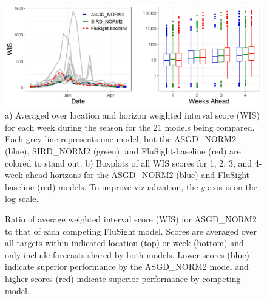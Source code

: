 \documentclass[ba]{imsart}
\theoremstyle{plain}
\theoremstyle{definition}
\theoremstyle{remark}
\begin{document}
\begin{supplement}
\begin{figure}[hbt!]
    \begin{adjustwidth}{-1.2cm}{-1.5cm}
    \includegraphics[scale = .54]{Images/wis_cover_sum.png}
    \caption{a) Averaged over location and horizon weighted interval score
    (WIS) for each week during the season for the 21 models being compared. 
    Each grey line represents one model, but the ASGD\_NORM2 (blue),
    SIRD\_NORM2 (green), and 
    FluSight-baseline (red) are colored to stand out.
    b) Boxplots of all WIS scores for 1, 2, 3, and 4-week ahead horizons 
    for the ASGD\_NORM2 (blue) and FluSight-baseline (red) models. 
    To improve vizualization, the $y$-axis
    is on the log scale.}
    \end{adjustwidth}
    \label{fig:wis_cover_sum}
\end{figure}

\begin{figure}[hbt!]
\begin{adjustwidth}{-1.2cm}{-1.5cm}
    \centering
    \end{adjustwidth}
    \caption{Ratio of average weighted interval score (WIS) for ASGD\_NORM2 
    to that of each competing FluSight model. Scores are averaged
    over all targets within indicated location (top) or week (bottom) and 
    only include forecasts shared by both models. Lower scores (blue) indicate
    superior performance by the ASGD\_NORM2 model and higher scores (red)
    indicate superior performance by competing model.}
    \label{fig:state_and_date_wis}
    

\end{figure}
\end{supplement}
\end{document}
